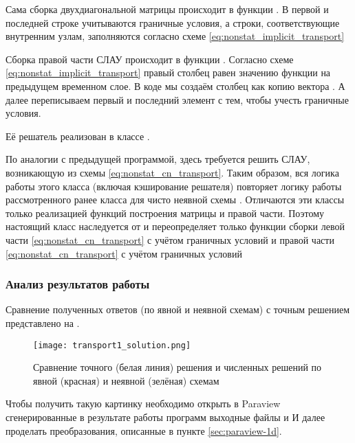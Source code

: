 Сама сборка двухдиагональной матрицы происходит в функции .
В первой и последней строке учитываются граничные условия, а строки, соответствующие внутренним узлам,
заполняются согласно схеме \eqref{eq:nonstat_implicit_transport}

Сборка правой части СЛАУ происходит в функции .
Согласно схеме \eqref{eq:nonstat_implicit_transport}
правый столбец равен значению функции на предыдущем временном слое.
В коде мы создаём столбец  как копию вектора .
А далее переписываем первый и последний элемент с тем, чтобы
учесть граничные условия.

Её решатель реализован в классе .

По аналогии с предыдущей программой, здесь требуется
решить СЛАУ, возникающую из схемы \eqref{eq:nonstat_cn_transport}.
Таким образом, вся логика работы этого класса (включая кэширование решателя) повторяет логику
работы рассмотренного ранее класса для чисто неявной схемы .
Отличаются эти классы только реализацией функций построения матрицы и
правой части. Поэтому настоящий класс наследуется от 
и переопределяет только функции 
сборки левой части \eqref{eq:nonstat_cn_transport} с учётом граничных условий
и правой части \eqref{eq:nonstat_cn_transport} с учётом граничных условий

\subsubsection{Анализ результатов работы}

Сравнение полученных ответов (по явной и неявной схемам) с точным решением представлено на .
\begin{figure}[h]
\centering
\texttt{[image: transport1\_solution.png]}
\caption{Сравнение точного (белая линия) решения и численных решений по явной (красная) и неявной (зелёная) схемам}
\label{fig:transport1_solution}
\end{figure}

Чтобы получить такую картинку необходимо открыть в
Paraview сгенерированные в результате работы программ
выходные файлы 
и 
И далее проделать преобразования, описанные в пункте \ref{sec:paraview-1d}.


